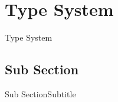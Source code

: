 \section{Type System}
\begin{frame}{Type System}

\end{frame}

\subsection{Sub Section}
\begin{frame}{Sub Section}{Subtitle}

\end{frame}